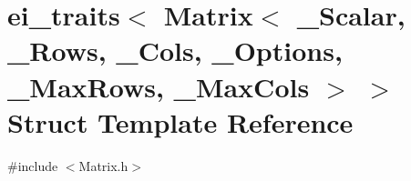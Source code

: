\hypertarget{structei__traits_3_01_matrix_3_01___scalar_00_01___rows_00_01___cols_00_01___options_00_01___max42eca4acfde64c6129563dd143e7773e}{\section{ei\-\_\-traits$<$ Matrix$<$ \-\_\-\-Scalar, \-\_\-\-Rows, \-\_\-\-Cols, \-\_\-\-Options, \-\_\-\-Max\-Rows, \-\_\-\-Max\-Cols $>$ $>$ Struct Template Reference}
\label{structei__traits_3_01_matrix_3_01___scalar_00_01___rows_00_01___cols_00_01___options_00_01___max42eca4acfde64c6129563dd143e7773e}
}


{\ttfamily \#include $<$Matrix.\-h$>$}

